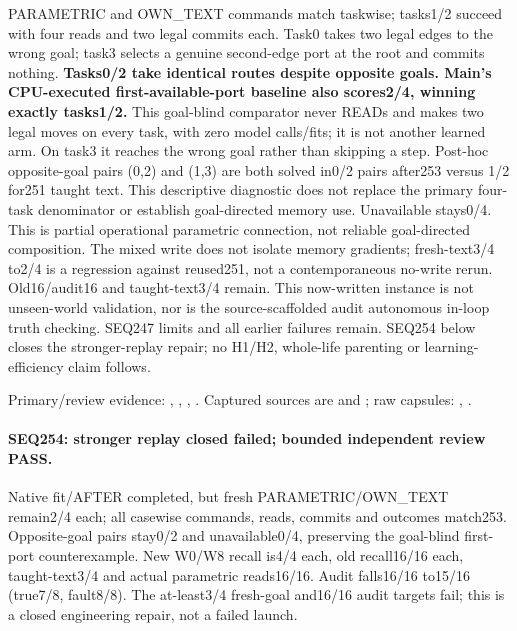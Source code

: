 \documentclass{article}
\begin{document}
PARAMETRIC and OWN\_TEXT commands match taskwise; tasks1/2 succeed with four
reads and two legal commits each. Task0 takes two legal edges to the wrong
goal; task3 selects a genuine second-edge port at the root and commits nothing.
\textbf{Tasks0/2 take identical routes despite opposite goals. Main's
CPU-executed first-available-port baseline also scores2/4, winning exactly
tasks1/2.} This goal-blind comparator never READs and makes two legal moves
on every task, with zero model calls/fits; it is not another learned arm.
On task3 it reaches the wrong goal rather than skipping a step. Post-hoc
opposite-goal pairs (0,2) and (1,3) are both solved in0/2 pairs after253 versus
1/2 for251 taught text. This descriptive diagnostic does not replace the
primary four-task denominator or establish goal-directed memory use.
Unavailable stays0/4. This is partial operational
parametric connection, not reliable goal-directed composition. The mixed
write does not isolate memory gradients; fresh-text3/4 to2/4 is a regression
against reused251, not a contemporaneous no-write rerun. Old16/audit16 and
taught-text3/4 remain. This now-written instance is not unseen-world
validation, nor is the source-scaffolded audit autonomous in-loop truth checking.
SEQ247 limits and all earlier failures remain. SEQ254 below closes the
stronger-replay repair; no H1/H2, whole-life parenting or learning-efficiency
claim follows.

Primary/review evidence:
,
,
,
.
Captured sources are and
; raw capsules:
,
.

\paragraph{SEQ254: stronger replay closed failed; bounded independent review PASS.}
Native fit/AFTER completed, but fresh PARAMETRIC/OWN\_TEXT remain2/4 each;
all casewise commands, reads, commits and outcomes match253. Opposite-goal
pairs stay0/2 and unavailable0/4, preserving the goal-blind first-port
counterexample. New W0/W8 recall is4/4 each, old recall16/16 each,
taught-text3/4 and actual parametric reads16/16. Audit falls16/16 to15/16
(true7/8, fault8/8). The at-least3/4 fresh-goal and16/16 audit targets fail;
this is a closed engineering repair, not a failed launch.
\end{document}
